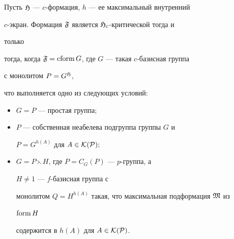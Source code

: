 \begin{thm} 


Пусть $\frak H$ --- $c$-формация, $h$ --- ее максимальный внутренний 


$c$-экран. Формация $\frak F$ является $\frak H_c$-критической тогда и 


только 


тогда, когда $\frak F=\operatorname{cform} G$, где $G$ --- такая $c$-базисная группа 


с монолитом $P=G^{\frak H}$, 


что выполняется одно из следующих условий$:$ 


\begin{itemize} 


\item[1)] $G=P$ --- простая группа$;$ 


\item[2)] $P$ --- собственная неабелева подгруппа группы $G$ и 


$P=G^{h(A)}$ для $A\in\cal K(P);$ 


\item[3)] $G=P\leftthreetimes H$, где $P=C_G(P)$ --- $p$-группа, а 


$H\ne1$ --- $f$-базисная группа с 


монолитом $Q=H^{h(A)}$ такая, что максимальная подформация $\frak M$ из 


$\operatorname{form} H$ 


содержится в $h(A)$ для $A\in\cal K(P)$. 


\end{itemize} 


\end{thm} 


 


